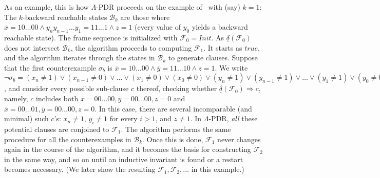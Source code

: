 \documentclass[acmsmall,screen]{acmart}
\newcommand{\ov}{\overline}
\renewcommand{\implies}{\Longrightarrow}
\newcommand{\true}{{\textit{true}}}
\newcommand{\Init}{{\textit{Init}}}
\newcommand{\tr}{\delta}
\newcommand{\Frame}{\mathcal{F}}
\renewcommand{\vec}{\ov}
\newcommand{\reflextr}[1]{\underline{#1}}
\newcommand{\postimage}[2]{{\reflextr{#1}}({#2})}
\newcommand{\bkwrch}[1]{\mathcal{B}_{#1}}
\begin{document}
\begin{changebar}
As an example, this is how $\Lambda$-PDR proceeds on the example of~ with (say) $k=1$:
The $k$-backward reachable states $\bkwrch{k}$ are those where $\vec{x} = 10\ldots00 \land y_n y_{n-1} \ldots y_1 = 11\ldots1 \land z=1$ (every value of $y_0$ yields a backward reachable state).
The frame sequence is initialized with $\Frame_0 = \Init$. As $\postimage{\tr}{\Frame_0}$ does not intersect $\bkwrch{k}$, the algorithm proceeds to computing $\Frame_1$. It starts as $\true$, and the algorithm iterates through the states in $\bkwrch{k}$ to generate clauses. Suppose that the first counterexample $\sigma_b$ is $\vec{x} = 10\ldots00 \land \vec{y} = 11\ldots10 \land z=1$. We write
$\neg \sigma_b = (x_n \neq 1) \lor (x_{n-1} \neq 0) \lor \ldots \lor (x_{1} \neq 0) \lor (x_{0} \neq 0) \lor (y_n \neq 1) \lor (y_{n-1} \neq 1) \lor \ldots \lor (y_1 \neq 1) \lor (y_0 \neq 0) \lor (z \neq 1)$, and consider every possible sub-clause $c$ thereof, checking whether $\postimage{\tr}{\Frame_0} \implies c$, namely, $c$ includes both $\vec{x}=00\ldots00,\vec{y}=00\ldots00,z=0$ and $\vec{x}=00\ldots01,\vec{y}=00\ldots00,z=0$. In this case, there are several incomparable (and minimal) such $c$'s: $x_n \neq 1$, $y_i \neq 1$ for every $i>1$, and $z \neq 1$. 
In $\Lambda$-PDR, \emph{all} these potential clauses are conjoined to $\Frame_1$.
The algorithm performs the same procedure for all the counterexamples in $\bkwrch{k}$.
Once this is done, $\Frame_1$ never changes again in the course of the algorithm, and it becomes the basis for constructing $\Frame_2$ in the same way, and so on until an inductive invariant is found or a restart becomes necessary. (We later show the resulting $\Frame_1,\Frame_2,\ldots$ in this example.)
\end{changebar}

%
%
\end{document}
